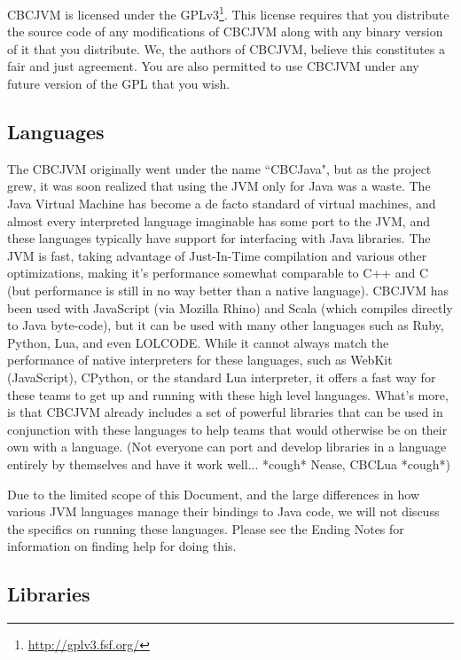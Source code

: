 \documentclass[12pt,letterpaper]{article}
\newcommand{\urlfootnote}[1]{\footnote{\url{#1}}}
\begin{document}
CBCJVM is licensed under the GPLv3\urlfootnote{http://gplv3.fsf.org/}. This license requires that you distribute the source code of any modifications of CBCJVM along with any binary version of it that you distribute. We, the authors of CBCJVM, believe this constitutes a fair and just agreement. You are also permitted to use CBCJVM under any future version of the GPL that you wish.



\subsection{Languages}

The CBCJVM originally went under the name ``CBCJava", but as the project grew, it was soon realized that using the JVM only for Java was a waste. The Java Virtual Machine has become a de facto standard of virtual machines, and almost every interpreted language imaginable has some port to the JVM, and these languages typically have support for interfacing with Java libraries. The JVM is fast, taking advantage of Just-In-Time compilation and various other optimizations, making it's performance somewhat comparable to C++ and C (but performance is still in no way better than a native language). CBCJVM has been used with JavaScript (via Mozilla Rhino) and Scala (which compiles directly to Java byte-code), but it can be used with many other languages such as Ruby, Python, Lua, and even LOLCODE. While it cannot always match the performance of native interpreters for these languages, such as WebKit (JavaScript), CPython, or the standard Lua interpreter, it offers a fast way for these teams to get up and running with these high level languages. What's more, is that CBCJVM already includes a set of powerful libraries that can be used in conjunction with these languages to help teams that would otherwise be on their own with a language. (Not everyone can port and develop libraries in a language entirely by themselves and have it work well... *cough* Nease, CBCLua *cough*)

Due to the limited scope of this Document, and the large differences in how various JVM languages manage their bindings to Java code, we will not discuss the specifics on running these languages. Please see the Ending Notes for information on finding help for doing this.



\subsection{Libraries}
\end{document}

